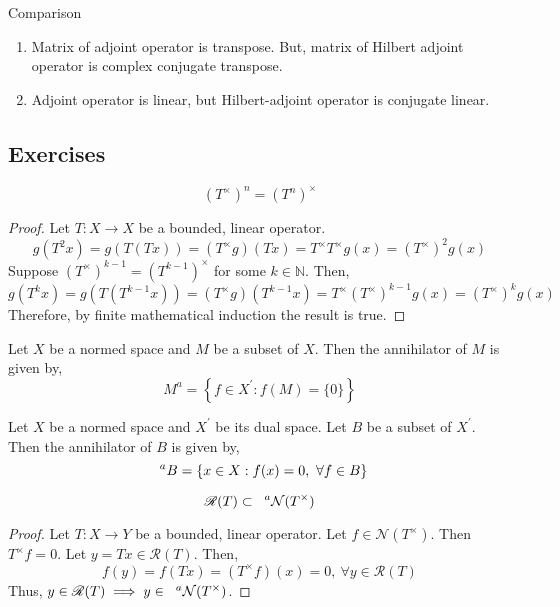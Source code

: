 \begin{remark}Comparison
\begin{enumerate}
	\item Matrix of adjoint operator is transpose. But, matrix of Hilbert adjoint operator is complex conjugate transpose.
	\item Adjoint operator is linear, but Hilbert-adjoint operator is conjugate linear.
\end{enumerate}
\end{remark}

\subsection{Exercises}
\cite[\S 4.5 Exercise 6]{kreyszig}
\begin{remark}
	\[ (T^\times)^n = (T^n)^\times \]
\end{remark}
\begin{proof}
	Let $T : X \to X$ be a bounded, linear operator.
	\[ g(T^2 x) = g(T(Tx)) = (T^\times g)(Tx) = T^\times T^\times g(x) = (T^\times)^2 g(x) \]
	Suppose $(T^\times)^{k-1} = (T^{k-1})^\times$ for some $k \in \mathbb{N}$.
	Then,
	\[ g(T^k x) = g(T(T^{k-1}x)) = (T^\times g)(T^{k-1}x) = T^\times (T^\times)^{k-1} g(x) = (T^\times)^k g(x) \]
	Therefore, by finite mathematical induction the result is true.
\end{proof}

\begin{definition}
	Let $X$ be a normed space and $M$ be a subset of $X$.
	Then the annihilator of $M$ is given by,
	\[ M^a = \left\{ f \in X^\prime : f(M) = \{ 0 \} \right\} \]
\end{definition}

\begin{definition}
	Let $X$ be a normed space and $X^\prime$ be its dual space.
	Let $B$ be a subset of $X^\prime$.
	Then the annihilator of $B$ is given by,
	\[ \hphantom{x}^aB = \{ x \in X : f(x) = 0,\ \forall f \in B \} \] %
\end{definition}

\begin{remark}
	\[ \mathscr{R}(T) \subset \hphantom{x}^a\mathcal{N}(T^\times) \]
\end{remark}
\begin{proof}
	Let $T : X \to Y$ be a bounded, linear operator.
	Let $f \in \mathcal{N}(T^\times)$.
	Then $T^\times f = 0$.
	Let $y = Tx \in \mathscr{R}(T)$.
	Then,
	\[ f(y) = f(Tx) = (T^\times f) (x) = 0,\ \forall y \in \mathscr{R}(T) \]
	Thus, $y \in \mathscr{R}(T) \implies y \in \hphantom{x}^a\mathcal{N}(T^\times)$.
\end{proof}

